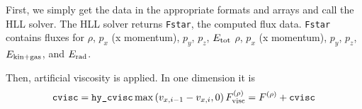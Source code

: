 \documentclass[preprint,11pt]{aastex}
\newcommand{\bea}{\begin{eqnarray}}
\newcommand{\eea}{\end{eqnarray}}
\begin{document}
First, we simply get the data in the appropriate formats and arrays and call the HLL solver.  The HLL solver returns \verb!Fstar!, the computed flux data.  \verb!Fstar! contains fluxes for {\color{red}$\rho$, $p_x$ (x momentum), $p_y$, $p_z$, $E_{\rm tot}$} {\color{blue}$\rho$, $p_x$ (x momentum), $p_y$, $p_z$, $E_{\rm kin+gas}$, and $E_{\rm rad}$}.

Then, artificial viscosity is applied.  In one dimension it is
\bea
\verb!cvisc! = \verb!hy_cvisc! \max\left(v_{x,i-1} - v_{x,i},0 \right)
F^{(\rho)}_{\rm visc} = F^{(\rho)} + \verb!cvisc! 
\eea
\end{document}
